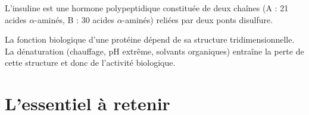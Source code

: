 \begin{exemple}
L'insuline est une hormone polypeptidique constituée de deux chaînes (A : 21 acides $\alpha$-aminés, B : 30 acides $\alpha$-aminés) reliées par deux ponts disulfure.
\end{exemple}

\begin{aretenir}
La fonction biologique d'une protéine dépend de sa structure tridimensionnelle. La dénaturation (chauffage, pH extrême, solvants organiques) entraîne la perte de cette structure et donc de l'activité biologique.
\end{aretenir}

\section{L'essentiel à retenir}

